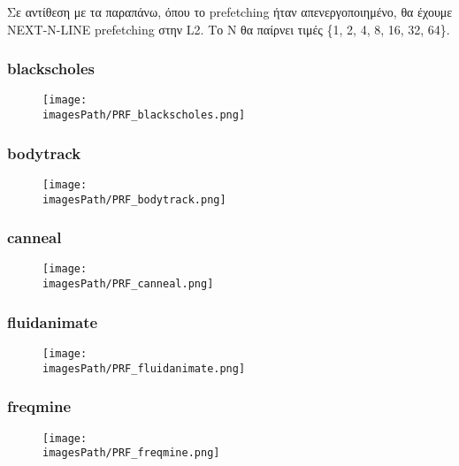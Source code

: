 \documentclass[12pt,a4paper]{article}
\newcommand{\imagesPath}{parsec-3.0/parsec_workspace/graphs}
\begin{document}
			Σε αντίθεση με τα παραπάνω, όπου το prefetching ήταν απενεργοποιημένο, θα έχουμε NEXT-N-LINE prefetching στην L2. Το N θα παίρνει τιμές \{1, 2, 4, 8, 16, 32, 64\}.
		
			\subsubsection{blackscholes}
				\begin{figure}[H]
					\begin{center}
						\texttt{[image: \\imagesPath/PRF\_blackscholes.png]}
					\end{center}
				\end{figure}
			
			\subsubsection{bodytrack}
				\begin{figure}[H]
					\begin{center}
						\texttt{[image: \\imagesPath/PRF\_bodytrack.png]}
					\end{center}
				\end{figure}

			\subsubsection{canneal}
				\begin{figure}[H]
					\begin{center}
						\texttt{[image: \\imagesPath/PRF\_canneal.png]}
					\end{center}
				\end{figure}

			\subsubsection{fluidanimate}
				\begin{figure}[H]
					\begin{center}
						\texttt{[image: \\imagesPath/PRF\_fluidanimate.png]}
					\end{center}
				\end{figure}
			
			\subsubsection{freqmine}
				\begin{figure}[H]
					\begin{center}
						\texttt{[image: \\imagesPath/PRF\_freqmine.png]}
					\end{center}
				\end{figure}
\end{document}

